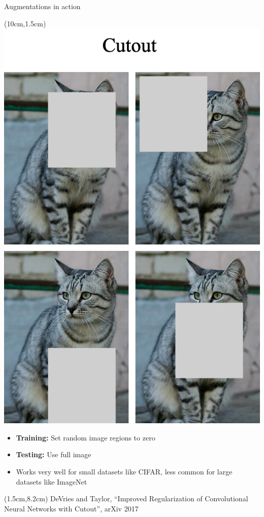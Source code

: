 \documentclass[serif, aspectratio=169]{beamer}
\begin{document}
\begin{frame}{Augmentations in action}
	\begin{textblock*}{5cm}(10cm,1.5cm) %
		\includegraphics[keepaspectratio, scale=0.18]{pic/cutout}
	\end{textblock*}

	\begin{itemize}
		\item \textbf{Training:} Set random image regions to zero 
		\item \textbf{Testing:} Use full image
		\item Works very well for small datasets like CIFAR, less \newline common for large datasets like ImageNet
	\end{itemize}

	\begin{textblock*}{10cm}(1.5cm,8.2cm) %
		\tiny{DeVries and Taylor, ``Improved Regularization of Convolutional
		Neural Networks with Cutout'', arXiv 2017}
	\end{textblock*}	

	
\end{frame}
\end{document}
